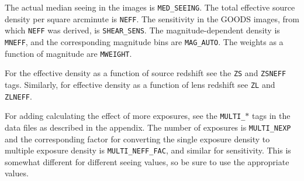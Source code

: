 \documentclass[12pt,preprint]{aastex}
\begin{document}
The actual median seeing in the images is \texttt{MED\_SEEING}.  The total
effective source density per square arcminute is \texttt{NEFF}.  The
sensitivity in the GOODS images, from which \texttt{NEFF} was derived, is
\texttt{SHEAR\_SENS}.   The magnitude-dependent density is \texttt{MNEFF}, and
the corresponding magnitude bins are \texttt{MAG\_AUTO}.  The weights as a
function of magnitude are \texttt{MWEIGHT}.  

For the effective density as a function of source redshift see the
\texttt{ZS} and \texttt{ZSNEFF} tags.  Similarly, for effective density
as a function of lens redshift see \texttt{ZL} and \texttt{ZLNEFF}.

For adding calculating the effect of more exposures, see the
\texttt{MULTI\_$*$} tags in the data files as described in the appendix.  The
number of exposures is \texttt{MULTI\_NEXP} and the corresponding factor for
converting the single exposure density to multiple exposure density is
\texttt{MULTI\_NEFF\_FAC}, and similar for sensitivity.  This is somewhat
different for different seeing values, so be sure to use the appropriate
values.
\end{document}
